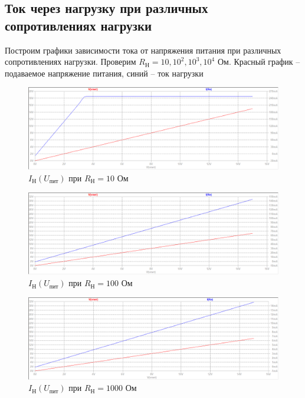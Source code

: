 \documentclass[a4paper, 12pt]{article}
\begin{document}
    \subsection{Ток через нагрузку при различных сопротивлениях нагрузки}
    Построим графики зависимости тока от напряжения питания при различных сопротивлениях нагрузки.
    Проверим $R_\text{Н}=10,10^2,10^3,10^4$ Ом. Красный график -- подаваемое напряжение питания,
    синий -- ток нагрузки
    \begin{figure}[H]
        \centering
        \includegraphics[scale=0.46]{3task_Iн(Vпит)_Rн10.png}
        \captionsetup{skip=0pt}
        \caption{$I_\text{Н}\left( U_\text{пит} \right)$ при $R_\text{Н}=10$ Ом}
        \label{fig:3task_InVlR10}
    \end{figure}
    \begin{figure}[H]
        \centering
        \includegraphics[scale=0.46]{3task_Iн(Vпит)_Rн100.png}
        \captionsetup{skip=0pt}
        \caption{$I_\text{Н}\left( U_\text{пит} \right)$ при $R_\text{Н}=100$ Ом}
        \label{fig:3task_InVlR100}
    \end{figure}
    \begin{figure}[H]
        \centering
        \includegraphics[scale=0.46]{3task_Iн(Vпит)_Rн1000.png}
        \captionsetup{skip=0pt}
        \caption{$I_\text{Н}\left( U_\text{пит} \right)$ при $R_\text{Н}=1000$ Ом}
        \label{fig:3task_InVlR1000}
    \end{figure}
\end{document}

